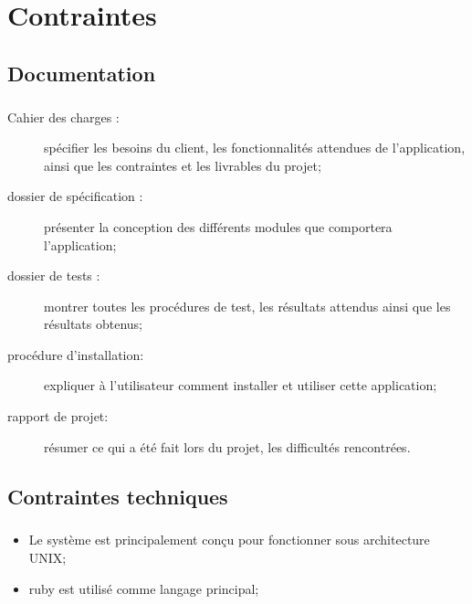 \chapter{Contraintes}


\section{Documentation}
        \paragraph*{}
        \begin{description}
                \item[Cahier des charges :] spécifier les besoins du client, les fonctionnalités attendues de l’application, ainsi que les contraintes et les livrables du projet;
                \item[dossier de spécification :] présenter la conception des différents modules que comportera l’application;
                \item[dossier de tests :] montrer toutes les procédures de test, les résultats attendus ainsi que les résultats obtenus;
                \item[procédure d'installation:] expliquer à l’utilisateur comment installer et utiliser cette application;
                \item[rapport de projet:] résumer ce qui a été fait lors du projet, les difficultés rencontrées.
        \end{description}


\section{Contraintes techniques}
        \paragraph*{}
        \begin{itemize}
                \item Le système est principalement conçu pour fonctionner sous architecture UNIX;%
                \item ruby est utilisé comme langage principal;
        \end{itemize}


